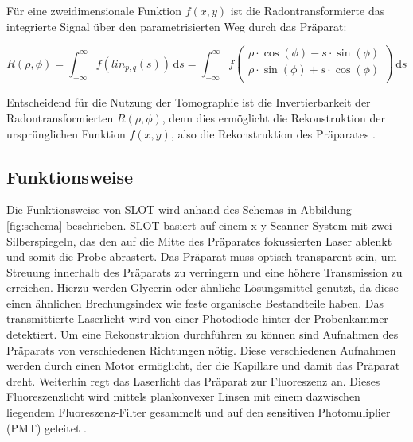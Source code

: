 Für eine zweidimensionale Funktion $f(x,y)$ ist die Radontransformierte das integrierte Signal über den parametrisierten Weg durch das Präparat:

\begin{equation}
R(\rho,\phi) = \int_{- \infty}^{\infty} f(lin_{p,q}(s)) \,\mathrm{d}s
=
\int_{- \infty}^{\infty} f\begin{pmatrix}
\rho \cdot \cos(\phi) - s \cdot \sin(\phi) \\
\rho \cdot \sin(\phi) + s \cdot \cos(\phi) \\
\end{pmatrix} \,\mathrm{d}s
\end{equation}

Entscheidend für die Nutzung der Tomographie ist die Invertierbarkeit der Radontransformierten $R(\rho,\phi)$, denn dies ermöglicht die Rekonstruktion der ursprünglichen Funktion $f(x,y)$, also die Rekonstruktion des Präparates \cite{slot_paper}.

\subsection{Funktionsweise}
Die Funktionsweise von SLOT wird anhand des Schemas in Abbildung \ref{fig:schema} beschrieben.
SLOT basiert auf einem x-y-Scanner-System mit zwei Silberspiegeln, das den auf die Mitte des Präparates fokussierten Laser ablenkt und somit die Probe abrastert.
Das Präparat muss optisch transparent sein, um Streuung innerhalb des Präparats zu verringern und eine höhere Transmission zu erreichen.
Hierzu werden Glycerin oder ähnliche Lösungsmittel genutzt, da diese einen ähnlichen Brechungsindex wie feste organische Bestandteile haben.
Das transmittierte Laserlicht wird von einer Photodiode hinter der Probenkammer detektiert.
Um eine Rekonstruktion durchführen zu können sind Aufnahmen des Präparats von verschiedenen Richtungen nötig.
Diese verschiedenen Aufnahmen werden durch einen Motor ermöglicht, der die Kapillare und damit das Präparat dreht.
Weiterhin regt das Laserlicht das Präparat zur Fluoreszenz an.
Dieses Fluoreszenzlicht wird mittels plankonvexer Linsen mit einem dazwischen liegendem Fluoreszenz-Filter gesammelt und auf den sensitiven Photomuliplier (PMT) geleitet \cite{Anleitung}.\\

